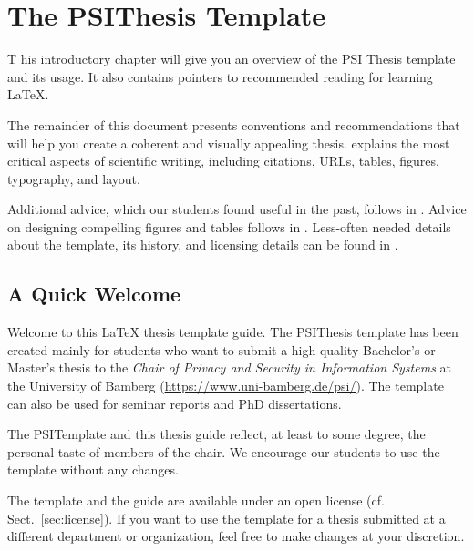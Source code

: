 \chapter{The PSIThesis Template} %

\label{Chapter1} %


T his introductory chapter will give you an overview of the PSI Thesis template and its usage.
It also contains pointers to recommended reading for learning \LaTeX{}.

The remainder of this document presents conventions and recommendations that will help you create a coherent and visually appealing thesis.  explains the most critical aspects of scientific writing, including citations, URLs, tables, figures, typography, and layout.

Additional advice, which our students found useful in the past, follows in . Advice on designing compelling figures and tables follows in . Less-often needed details about the template, its history, and licensing details can be found in .

\section{A Quick Welcome}

Welcome to this LaTeX thesis template guide.%
The PSIThesis template has been created mainly for students who want to submit a high-quality Bachelor's or Master's thesis to the \emph{Chair of Privacy and Security in Information Systems} at the University of Bamberg (\url{https://www.uni-bamberg.de/psi/}). The template can also be used for seminar reports and PhD dissertations.

The PSITemplate and this thesis guide reflect, at least to some degree, the personal taste of members of the chair.
We encourage our students to use the template without any changes.

The template and the guide are available under an open license (cf. Sect.~\ref{sec:license}). If you want to use the template for a thesis submitted at a different department or organization, feel free to make changes at your discretion.

